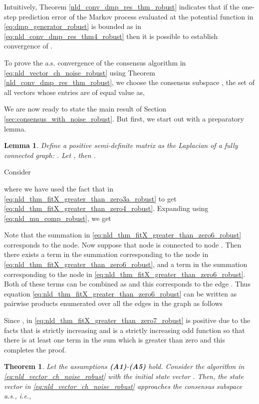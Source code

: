 \documentclass[onecolumn, draft, 12pt]{IEEEtran}
\newtheorem{thm}{Theorem}
\newtheorem{lem}{Lemma}
\begin{document}
Intuitively, Theorem \ref{nld_conv_dmp_res_thm_robust} indicates that if the one-step prediction error of the Markov process evaluated at the potential function in \eqref{eq:dmp_generator_robust} is bounded as in \eqref{eq:nld_conv_dmp_res_thm4_robust} then it is possible to establish convergence of .

To prove the a.s. convergence of the consensus algorithm in \eqref{eq:nld_vector_ch_noise_robust} using Theorem \ref{nld_conv_dmp_res_thm_robust}, we choose the consensus subspace , the set of all vectors whose entries are of equal value as,


We are now ready to state the main result of Section \ref{sec:consensus_with_noise_robust}. But first, we start out with a preparatory lemma.

\begin{lem} \label{nld_lem_XMmx_positive} 
Define a positive semi-definite matrix  as the Laplacian of a fully connected graph: . Let , then .
\end{lem}
\begin{IEEEproof}
Consider

where we have used the fact that  in \eqref{eq:nld_thm_fitX_greater_than_zero3a_robust} to get \eqref{eq:nld_thm_fitX_greater_than_zero4_robust}. Expanding  using \eqref{eq:nld_mu_comp_robust}, we get 

Note that the  summation in \eqref{eq:nld_thm_fitX_greater_than_zero6_robust} corresponds to the  node. Now suppose that node  is connected to node . Then there exists a term  in the summation corresponding to the  node in \eqref{eq:nld_thm_fitX_greater_than_zero6_robust}, and a term  in the summation corresponding to the  node in \eqref{eq:nld_thm_fitX_greater_than_zero6_robust}. Both of these terms can be combined as  and this corresponds to the edge . Thus equation \eqref{eq:nld_thm_fitX_greater_than_zero6_robust} can be written as pairwise products enumerated over all the edges in the graph as follows

Since ,  in \eqref{eq:nld_thm_fitX_greater_than_zero7_robust} is positive due to the facts that  is strictly increasing and  is a strictly increasing odd function so that there is at least one term in the sum which is greater than zero and this completes the proof. 
\end{IEEEproof}

\begin{thm} \label{nld_thm_as_conv_fixed_graph_robust} Let the assumptions \textbf{(A1)}-\textbf{(A5)} hold. Consider the  algorithm in \eqref{eq:nld_vector_ch_noise_robust} with the initial state vector . Then, the state vector  in \eqref{eq:nld_vector_ch_noise_robust} approaches the consensus subspace  a.s., i.e.,


\end{thm}
\end{document}

